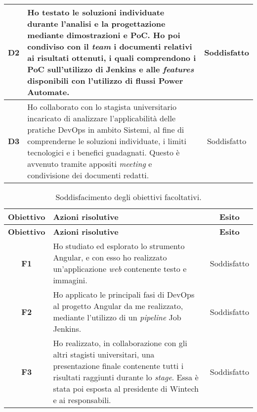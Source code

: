 \begin{longtable}{|c|p{8cm}|c|}
    \hline \textbf{D2}  & Ho testato le soluzioni individuate durante l'analisi e la progettazione mediante dimostrazioni e PoC. Ho poi condiviso con il \emph{team} i documenti relativi ai risultati ottenuti, i quali comprendono i PoC sull'utilizzo di Jenkins e alle \emph{features} disponibili con l'utilizzo di flussi Power Automate. & Soddisfatto\\
    \hline \textbf{D3}  & Ho collaborato con lo stagista universitario incaricato di analizzare l'applicabilità delle pratiche \gls{DevOps} in ambito \gls{Sistemi}, al fine di comprenderne le soluzioni individuate, i limiti tecnologici e i benefici guadagnati. Questo è avvenuto tramite appositi \emph{meeting} e condivisione dei documenti redatti. & Soddisfatto\\
\end{longtable}

\begin{longtable}{|c|p{8cm}|c|}
    \caption{Soddisfacimento degli obiettivi facoltativi.}
    \label{tab:soddObbFacoltativi}\\
    \hline \textbf{Obiettivo} & \textbf{Azioni risolutive} & \textbf{Esito}\\  \endfirsthead
    \hline \textbf{Obiettivo} & \textbf{Azioni risolutive} & \textbf{Esito}\\  \endhead
    \endfoot
    \hline \endlastfoot
    \hline \textbf{F1}  & Ho studiato ed esplorato lo strumento Angular, e con esso ho realizzato un'applicazione \emph{web} contenente testo e immagini. & Soddisfatto\\
    \hline \textbf{F2}  & Ho applicato le principali fasi di \gls{DevOps} al progetto Angular da me realizzato, mediante l'utilizzo di un \emph{pipeline} Job Jenkins. & Soddisfatto\\
    \hline \textbf{F3}  & Ho realizzato, in collaborazione con gli altri stagisti universitari, una presentazione finale contenente tutti i risultati raggiunti durante lo \emph{stage}. Essa è stata poi esposta al presidente di Wintech e ai responsabili. & Soddisfatto\\
\end{longtable}
\endgroup

